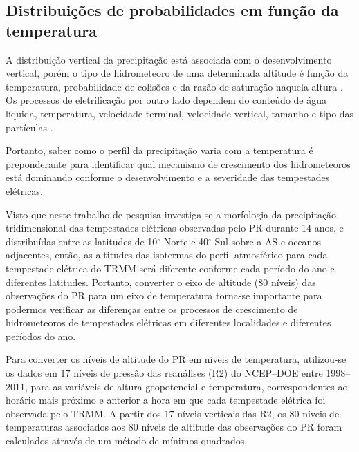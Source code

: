 \subsection{Distribuições de probabilidades em função da  temperatura}

A distribuição vertical da precipitação está associada com o desenvolvimento vertical, porém o tipo de hidrometeoro de uma  determinada altitude é função da temperatura, probabilidade de colisões e da razão de saturação naquela altura \cite[p.~263]{mason1971_2ed}. Os processos de eletrificação por outro lado dependem do conteúdo de água líquida, temperatura, velocidade terminal, velocidade vertical, tamanho e tipo das partículas \cite{Takahashi1978,Saunders1999,Takahashi2002,avila2009}.

Portanto, saber como o perfil da precipitação varia com a temperatura é preponderante para identificar qual mecanismo de crescimento dos hidrometeoros está dominando conforme o desenvolvimento e a severidade das tempestades elétricas.

Visto que neste trabalho de pesquisa investiga-se a morfologia da precipitação tridimensional das tempestades elétricas observadas pelo PR durante 14 anos, e distribuídas entre as latitudes de 10$^{\circ}$ Norte e 40$^{\circ}$ Sul sobre a AS e oceanos adjacentes, então, as altitudes das isotermas do perfil atmosférico para cada tempestade elétrica do TRMM será diferente conforme cada período do ano e diferentes latitudes. Portanto, converter o eixo de altitude (80 níveis) das observações do PR para um eixo de temperatura torna-se importante para podermos verificar as diferenças entre os processos de crescimento de hidrometeoros de tempestades elétricas em diferentes localidades e diferentes períodos do ano. 


Para converter os níveis de altitude do PR em níveis de temperatura, utilizou-se os dados em 17 níveis de pressão das reanálises (R2) do NCEP--DOE entre 1998--2011, para as  variáveis de altura geopotencial e temperatura, correspondentes ao horário mais próximo e anterior a hora em que cada tempestade elétrica foi observada pelo TRMM. A partir dos 17 níveis verticais das R2, os 80 níveis de temperaturas associados aos 80 níveis de altitude das observações do PR foram calculados através de um método de mínimos quadrados.

